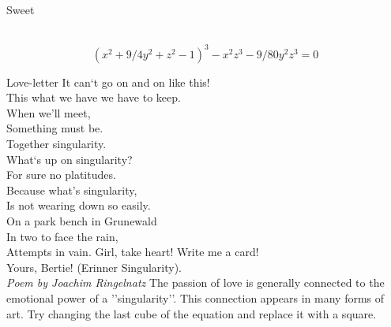 \documentclass[es]{./../../common/SurferDesc}%
\begin{document}
\footnotesize


\begin{surferPage}
  \begin{surferTitle}Sweet\end{surferTitle}   \\

\smallskip
\[(x^2+ 9/4y^2	+ z^2- 1)^3- x^2z^3	- 9/80y^2z^3	= 0\]

\singlespacing
Love-letter
\singlespacing
It can`t go on and on like this!\\
This what we have we have to keep.\\
When we'll meet,\\
Something must be.\\
Together singularity.\\
What`s up on singularity?\\
For sure no platitudes.\\
Because what's singularity,\\
Is not wearing down so easily.\\
On a park bench in Grunewald\\
In two to face the rain,\\
Attempts in vain. Girl, take heart! Write me a card!\\
Yours, Bertie! (Erinner Singularity).\\
{\it Poem by Joachim Ringelnatz}
\singlespacing 
The passion of love is generally connected to the emotional power of a ''singularity''. This connection appears in many forms of art.
\singlespacing 
Try changing the last cube of the equation and replace it with a square.



  \begin{surferText}
     \end{surferText}
\end{surferPage}
\end{document}
